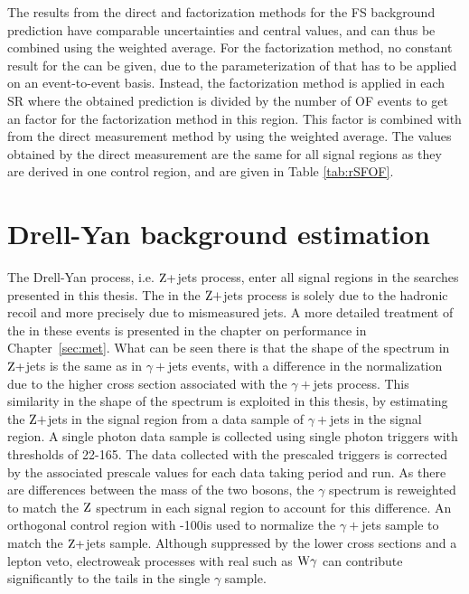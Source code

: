 The results from the direct and factorization methods for the FS background prediction have comparable uncertainties and central values, and can thus be combined using the weighted average. 
For the factorization method, no constant result for the \Rsfof can be given, due to the parameterization of \rmue that has to be applied on an event-to-event basis.
Instead, the factorization method is applied in each SR where the obtained prediction is divided by the number of OF events to get an \Rsfof factor for the factorization method in this region. 
This factor is combined with \Rsfof from the direct measurement method by using the weighted average.
The \Rsfof values obtained by the direct measurement are the same for all signal regions as they are derived in one control region, and are given in Table \ref{tab:rSFOF}. 
\section{Drell-Yan background estimation}\label{sec:mettemplates}
\noindent\justify
The Drell-Yan process, i.e. $\mathrm{Z}+$jets process, enter all signal regions in the searches presented in this thesis. 
The \ptmiss in the $\mathrm{Z}+$jets process is solely due to the hadronic recoil and more precisely due to mismeasured jets. 
A more detailed treatment of the \ptmiss in these events is presented in the chapter on \ptmiss performance in Chapter~\ref{sec:met}. 
What can be seen there is that the shape of the \ptmiss spectrum in $\mathrm{Z}+$jets is the same as in $\gamma+$jets events, with a difference in the normalization due to the higher cross section associated with the $\gamma+$jets process. 
This similarity in the shape of the \ptmiss spectrum is exploited in this thesis, by estimating the $\mathrm{Z}+$jets in the signal region from a data sample of $\gamma+$jets in the signal region. 
\newpara
\noindent\justify
A single photon data sample is collected using single photon triggers with \pt thresholds of 22-165\GeV. 
The data collected with the prescaled triggers is corrected by the associated prescale values for each data taking period and run. 
As there are differences between the mass of the two bosons, the $\gamma$ \pt spectrum is reweighted to match the $\mathrm{Z}$ spectrum in each signal region to account for this difference. 
An orthogonal control region with -100\GeV is used to normalize the $\gamma+$jets sample to match the $\mathrm{Z}+$jets sample.
Although suppressed by the lower cross sections and a lepton veto, electroweak processes with real \ptmiss such as $\mathrm{W}\gamma$ can contribute significantly to the \ptmiss tails in the single $\gamma$ sample.
